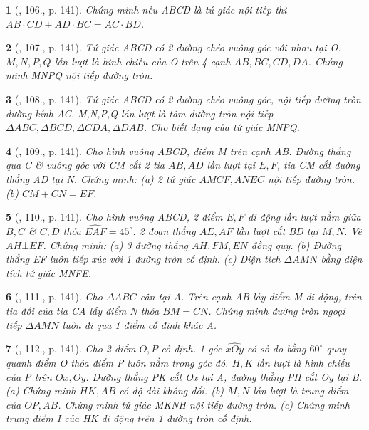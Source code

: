 \documentclass{article}
\newtheorem{baitoan}{}
\begin{document}
\begin{baitoan}[\cite{Tuyen_Toan_9_old}, 106., p. 141]
	Chứng minh nếu ABCD là tứ giác nội tiếp thì $AB\cdot CD + AD\cdot BC = AC\cdot BD$.
\end{baitoan}

\begin{baitoan}[\cite{Tuyen_Toan_9_old}, 107., p. 141]
	Tứ giác ABCD có 2 đường chéo vuông góc với nhau tại O. $M,N,P,Q$ lần lượt là hình chiếu của O trên 4 cạnh $AB,BC,CD,DA$. Chứng minh MNPQ nội tiếp đường tròn.
\end{baitoan}

\begin{baitoan}[\cite{Tuyen_Toan_9_old}, 108., p. 141]
	Tứ giác ABCD có 2 đường chéo vuông góc, nội tiếp đường tròn đường kính AC. M,N,P,Q lần lượt là tâm đường tròn nội tiếp $\Delta ABC,\Delta BCD,\Delta CDA,\Delta DAB$. Cho biết dạng của tứ giác MNPQ.
\end{baitoan}

\begin{baitoan}[\cite{Tuyen_Toan_9_old}, 109., p. 141]
	Cho hình vuông ABCD, điểm M trên cạnh AB. Đường thẳng qua C \& vuông góc với CM cắt 2 tia $AB,AD$ lần lượt tại $E,F$, tia CM cắt đường thẳng AD tại N. Chứng minh: (a) 2 tứ giác $AMCF,ANEC$ nội tiếp đường tròn. (b) $CM + CN = EF$.
\end{baitoan}

\begin{baitoan}[\cite{Tuyen_Toan_9_old}, 110., p. 141]
	Cho hình vuông ABCD, 2 điểm $E,F$ di động lần lượt nằm giữa $B,C$ \& $C,D$ thỏa $\widehat{EAF} = 45^\circ$. 2 đoạn thẳng $AE,AF$ lần lượt cắt BD tại $M,N$. Vẽ $AH\bot EF$. Chứng minh: (a) 3 đường thẳng $AH,FM,EN$ đồng quy. (b) Đường thẳng EF luôn tiếp xúc với 1 đường tròn cố định. (c) Diện tích $\Delta AMN$ bằng diện tích tứ giác MNFE.
\end{baitoan}

\begin{baitoan}[\cite{Tuyen_Toan_9_old}, 111., p. 141]
	Cho $\Delta ABC$ cân tại A. Trên cạnh AB lấy điểm M di động, trên tia đối của tia CA lấy điểm N thỏa $BM = CN$. Chứng minh đường tròn ngoại tiếp $\Delta AMN$ luôn đi qua 1 điểm cố định khác A.
\end{baitoan}

\begin{baitoan}[\cite{Tuyen_Toan_9_old}, 112., p. 141]
	Cho 2 điểm $O,P$ cố định. 1 góc $\widehat{xOy}$ có số đo bằng $60^\circ$ quay quanh điểm O thỏa điểm P luôn nằm trong góc đó. $H,K$ lần lượt là hình chiếu của P trên $Ox,Oy$. Đường thẳng PK cắt Ox tại A, đường thẳng PH cắt Oy tại B. (a) Chứng minh $HK,AB$ có độ dài không đổi. (b) $M,N$ lần lượt là trung điểm của $OP,AB$. Chứng minh tứ giác MKNH nội tiếp đường tròn. (c) Chứng minh trung điểm I của HK di động trên 1 đường tròn cố định.
\end{baitoan}
\end{document}
